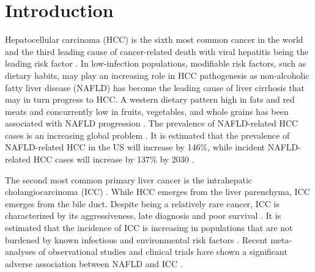 \documentclass[nutrients,article,submit,moreauthors,pdftex]{Definitions/mdpi}
\begin{document}

\hypertarget{sec1}{%
\section{Introduction}\label{sec1}}

Hepatocellular carcinoma (HCC) is the sixth most common cancer in the
world and the third leading cause of cancer-related death with viral
hepatitis being the leading risk factor \citep{Massarweh2017}. In
low-infection populations, modifiable risk factors, such as dietary
habits, may play an increasing role in HCC pathogenesis as non-alcoholic
fatty liver disease (NAFLD) has become the leading cause of liver
cirrhosis \citep{Younossi2016, Younossi2020} that may in turn progress to
HCC. A western dietary pattern high in fats and red meats and
concurrently low in fruits, vegetables, and whole grains has been
associated with NAFLD progression \citep{Guo2022}. The prevalence of
NAFLD-related HCC cases is an increasing global problem \citep{Younossi2016}.
It is estimated that the prevalence of NAFLD-related HCC in the US will
increase by 146\%, while incident NAFLD-related HCC cases will increase
by 137\% by 2030 \citep{Estes2018}.

The second most common primary liver cancer is the intrahepatic
cholangiocarcinoma (ICC) \citep{Khan2019}. While HCC emerges from the liver
parenchyma, ICC emerges from the bile duct. Despite being a relatively
rare cancer, ICC is characterized by its aggressiveness, late diagnosis
and poor survival \citep{kirstein2016}. It is estimated that the incidence of
ICC is increasing in populations that are not burdened by known
infectious and environmental risk factors \citep{Bergquist2015}. Recent
meta-analyses of observational studies and clinical trials have shown a
significant adverse association between NAFLD and ICC
\citep{Wongjarupong2017, corrao2020}.
\end{document}
